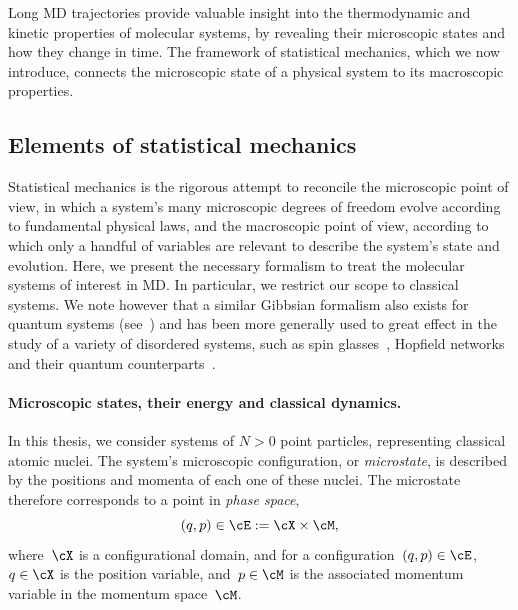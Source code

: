 Long MD trajectories provide valuable insight into the thermodynamic and kinetic properties of molecular systems, by revealing their microscopic states and how they change in time.
The framework of statistical mechanics, which we now introduce, connects the microscopic state of a physical system to its macroscopic properties.

\subsection{Elements of statistical mechanics}
Statistical mechanics is the rigorous attempt to reconcile the microscopic point of view, in which a system's many microscopic degrees of freedom evolve according to fundamental physical laws, and the macroscopic point of view, according to which only a handful of variables are relevant to describe the system's state and evolution.
Here, we present the necessary formalism to treat the molecular systems of interest in MD. In particular, we restrict our scope to classical systems.
We note however that a similar Gibbsian formalism also exists for quantum systems (see~\cite{F72}) and has been more generally used to great effect in the study of a variety of disordered systems, such as spin glasses~\cite{EA75}, Hopfield networks~\cite{P84} and their quantum counterparts~\cite{RY96,RMGLM18}.

\paragraph{Microscopic states, their energy and classical dynamics.}
In this thesis, we consider systems of $N>0$ point particles, representing classical atomic nuclei.
The system's microscopic configuration, or \textit{microstate}, is described by the positions and momenta of each one of these nuclei. The microstate therefore corresponds to a point in \textit{phase space}, 
\begin{equation}
    \label{eq:01:phase_space}
    (q,p)\in \cE := \cX\times \cM,
\end{equation}
where~$\cX$ is a configurational domain, and for a configuration~$(q,p)\in\cE$, $q\in\cX$ is the position variable, and~$p\in \cM$ is the associated momentum variable in the momentum space~$\cM$.

